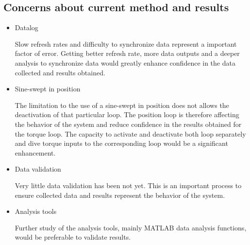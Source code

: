 \subsection{Concerns about current method and results}
\begin{itemize}
	\item Datalog
	
	Slow refresh rates and difficulty to synchronize data represent a important factor of error. Getting better refresh rate, more data outputs and a deeper analysis to synchronize data would greatly enhance confidence in the data collected and results obtained. 
	
	\item Sine-swept in position
	
	The limitation to the use of a sine-swept in position does not allows the deactivation of that particular loop. The position loop is therefore affecting the behavior of the system and reduce confidence in the results obtained for the torque loop. The capacity to activate and deactivate both loop separately and dive torque inputs to the corresponding loop would be a significant enhancement. 
    
    \item Data validation
    
    Very little data validation has been not yet. This is an important process to ensure collected data and results represent the behavior of the system.
    
	\item Analysis tools
	
	Further study of the analysis tools, mainly MATLAB data analysis functions, would be preferable to validate results.
	
\end{itemize}